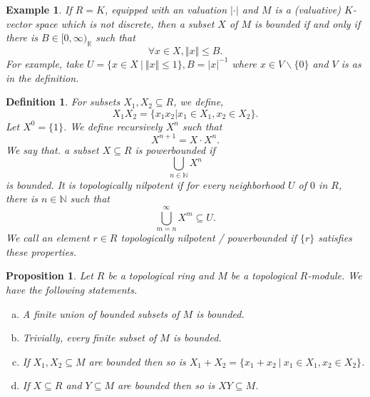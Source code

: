 \documentclass[8pt]{article}
\numberwithin{equation}{section}
\newtheorem{proposition}{Proposition}[subsection]
\newtheorem{definition}{Definition}[subsection]
\newtheorem{example}{Example}[subsection]
\newcommand{\norm}[1]{\Vert #1 \Vert}
\newcommand{\N}[0]{\mathbb{N}}
\newcommand{\R}[0]{\mathbb{R}}
\newcommand{\sep}[0]{\:|\:}
\newcommand{\ab}[1]{\vert #1 \vert}
\begin{document}
\begin{example}
    If $R=K$, equipped with an valuation $\ab{\cdot}$ and $M$ is a (valuative) $K$-vector space which is not discrete, then a subset $X$ of $M$ is bounded if and only if there is $B\in[0,\infty)_\R$ such that 
    \begin{equation*}
        \forall x\in X, \norm{x}\leq B.
    \end{equation*}
    For example, take $U = \{x\in X\sep \norm{x}\leq 1\}, B = \ab{x}^{-1}$ where $x\in V\backslash\{0\}$ and $V$ is as in the definition.
\end{example}
\begin{definition}
    \label{definition_11_3}
    For subsets $X_1,X_2\subseteq R$, we define,
    \begin{equation*}
        X_1X_2 = \{x_1x_2|x_1\in X_1,x_2\in X_2\}.
    \end{equation*}
    Let $X^0 = \{1\}$. We define recursively $X^n$ such that 
    \begin{equation*}
        X^{n+1} = X\cdot X^n.
    \end{equation*}
    We say that. a subset $X\subseteq R$ is powerbounded if 
    \begin{equation*}
        \bigcup_{n\in\N}X^n
    \end{equation*}
    is bounded. It is topologically nilpotent if for every neighborhood $U$ of $0$ in $R$, there is $n\in\N$ such that 
    \begin{equation*}
        \bigcup_{m=n}^\infty X^m \subseteq U.
    \end{equation*}
    We call an element $r\in R$ topologically nilpotent / powerbounded if $\{r\}$ satisfies these properties.
\end{definition}
\begin{proposition}
    \label{fact_11_3}
    Let $R$ be a topological ring and $M$ be a topological $R$-module. We have the following statements.
    \begin{enumerate}[a.]
        \item A finite union of bounded subsets of $M$ is bounded. 
        \item Trivially, every finite subset of $M$ is bounded.
        \item If $X_1,X_2\subseteq M$ are bounded then so is $X_1+X_2 = \{x_1+x_2\sep x_1\in X_1,x_2\in X_2\}$. 
        \item If $X\subseteq R$ and $Y\subseteq M$ are bounded then so is $XY\subseteq M$. 
    \end{enumerate}
\end{proposition}
\end{document}
